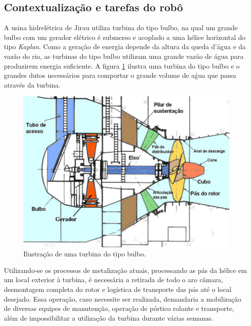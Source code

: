 \subsection{Contextualização e tarefas do robô}

A usina hidrelétrica de Jirau utiliza turbina do tipo bulbo, na qual um grande
bulbo com um gerador elétrico é submerso e acoplado a uma hélice horizontal do
tipo \textit{Kaplan}. Como a geração de energia depende da altura da queda
d'água e da vazão do rio, as turbinas do tipo bulbo utilizam uma grande vazão de
água para produzirem energia suficiente. A figura \ref{fig::bulb_turbine}
ilustra uma turbina do tipo bulbo e o grandes dutos necessários para comportar o
grande volume de aǵua que passa através da turbina. 

\begin{figure}[h!]	
	\includegraphics[width=\textwidth]{figs/intro/bulb_turbine}
	\caption{Ilustração de uma turbina do tipo bulbo.}
	\label{fig::bulb_turbine}
\end{figure}

Utilizando-se os processos de metalização atuais, processando as pás da hélice
em um local exterior à turbina, é necessária a retirada de todo o aro câmara,
desmontagem completa do rotor e logística de transporte das pás até o local
desejado. Essa operação, caso necessite ser realizada, demandaria a mobilização
de diversas equipes de manutenção, operação de pórtico rolante e transporte,
além de impossibilitar a utilização da turbina durante várias semanas.

